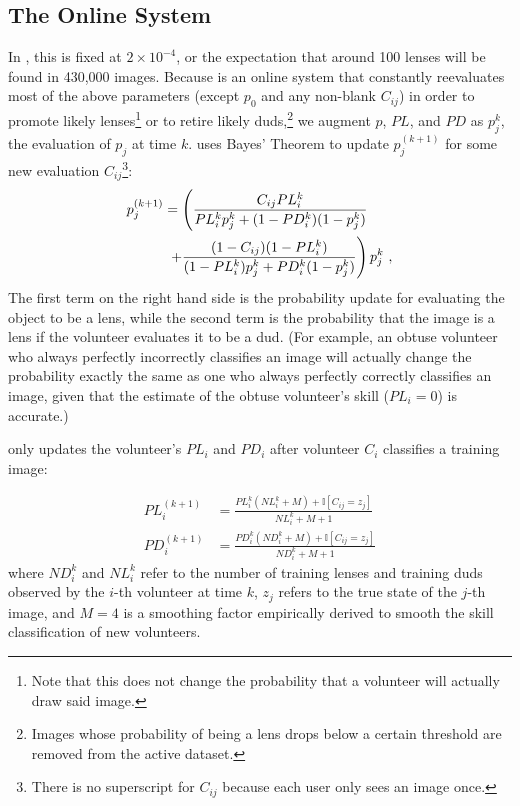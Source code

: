 \documentclass[useAMS,usenatbib,a4paper]{mn2e}
\begin{document}
\subsection{The Online System}
\label{sec:formalism:online}
In \sw, this is fixed at $2 \times 10^{-4}$, or the expectation that
around 100 lenses will be found in 430,000 images. Because \sw is an online
system that constantly reevaluates most of the above parameters (except $p_0$
and any non-blank $C_{ij}$) in order to promote likely lenses\footnote{Note
that this does not change the probability that a volunteer will actually draw
said image.} or to retire likely duds,\footnote{Images whose probability of
being a lens drops below a certain threshold are removed from the active
dataset.} we augment $p$, $PL$, and $PD$ as $p_j^k$, the evaluation of
$p_j$ at time $k$. \sw uses Bayes' Theorem to update $p_j^{(k + 1)}$ for
some new evaluation $C_{ij}$\footnote{There is no superscript for $C_{ij}$
because each user only sees an image once.}:
\begin{align}
  p_j^{(k + 1)} &= \left ( \frac{C_{ij} PL_{i}^{k}
  }{PL_{i}^{k} p_j^k + (1 - PD_{i}^{k})(1 -
  p_j^k)}
  \right. \notag \\ & \; \left . +
  \frac{(1 - C_{ij}) (1 - PL_{i}^{k})
  }{(1 - PL_{i}^{k}) p_j^k + PD_{i}^{k}(1 -
  p_j^k)} \right ) p_j^k \ ,
\end{align}
The first term on the right hand side is the probability update for evaluating
the object to be a lens, while the second term is the probability that the
image is a lens if the volunteer evaluates it to be a dud.  (For example, an
obtuse volunteer who always perfectly incorrectly classifies an image will
actually change the probability exactly the same as one who always perfectly
correctly classifies an image, given that the estimate of the obtuse
volunteer's skill ($PL_{i} = 0$) is accurate.)

\sw only updates the volunteer's $PL_{i}$ and $PD_{i}$ after volunteer $C_i$
classifies a training image:

\begin{align}
  PL_{i}^{(k + 1)} &= \frac{PL_{i}^{k} (NL_{i}^{k} + M) + \mathbb{I}[C_{ij} =
  z_{j}]}{NL_{i}^{k} + M + 1} \\
  PD_{i}^{(k + 1)} &= \frac{PD_{i}^{k} (ND_{i}^{k} + M) + \mathbb{I}[C_{ij} =
  z_{j}]}{ND_{i}^{k} + M + 1}
\end{align}
where $ND_{i}^{k}$ and $NL_{i}^{k}$ refer to the number of training lenses and
training duds observed by the $i$-th volunteer at time $k$, $z_{j}$ refers
to the true state of the $j$-th image, and $M = 4$ is a smoothing factor
empirically derived to smooth the skill classification of new volunteers.
\end{document}
